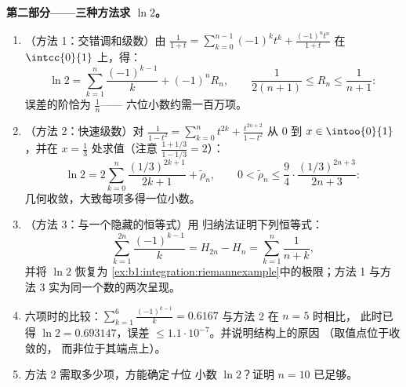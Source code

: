 \begin{problem}
\medskip
\noindent\textbf{第二部分——三种方法求 $\ln 2$。}
\begin{enumerate}[resume]
  \item （方法 1：交错调和级数）由 $\frac{1}{1+t} =
        \sum_{k=0}^{n-1}(-1)^k t^k + \frac{(-1)^n t^n}{1+t}$
        在 $\intcc{0}{1}$ 上，得：
        \[
        \ln 2 = \sum_{k=1}^{n} \frac{(-1)^{k-1}}{k} + (-1)^n
        R_n, \qquad \frac{1}{2(n+1)} \leq R_n \leq
        \frac{1}{n+1} :
        \]
        误差的阶恰为 $\frac 1n$——
        六位小数约需一百万项。
  \item （方法 2：快速级数）对 $\frac{1}{1 - t^2} =
        \sum_{k=0}^{n} t^{2k} + \frac{t^{2n+2}}{1-t^2}$ 从 $0$
        到 $x \in \intoo{0}{1}$ ，并在 $x = \frac13$
        处求值（注意 $\frac{1 + 1/3}{1 - 1/3} = 2$）：
        \[
        \ln 2 = 2\sum_{k=0}^{n} \frac{(1/3)^{2k+1}}{2k+1} +
        \tilde\rho_n,
        \qquad
        0 < \tilde\rho_n \leq \frac{9}{4}\cdot
        \frac{(1/3)^{2n+3}}{2n+3} :
        \]
        几何收敛，大致每项多得一位小数。
  \item （方法 3：与一个隐藏的恒等式）用
        归纳法证明下列恒等式：
        \[
        \sum_{k=1}^{2n} \frac{(-1)^{k-1}}{k} = H_{2n} - H_n =
        \sum_{k=1}^{n} \frac{1}{n + k} ,
        \]
        并将 $\ln 2$ 恢复为
        \cref{ex:b1:integration:riemannexample}中的极限；方法 1 与方法 3
        实为同一个数的两次呈现。
  \item 六项时的比较：$\sum_{k=1}^{6}
        \frac{(-1)^{k-1}}{k} = 0.6167$ 与方法 2 在 $n = 5$ 时相比，
        此时已得 $\ln 2 = 0.693147$，误差 $\leq
        1.1\cdot10^{-7}$。并说明结构上的原因
        （取值点位于收敛的，
        而非位于其端点上）。
  \item 方法 2 需取多少项，方能确定\emph{十}位
        小数 $\ln 2$？证明 $n = 10$ 已足够。
\end{enumerate}


\end{problem}
